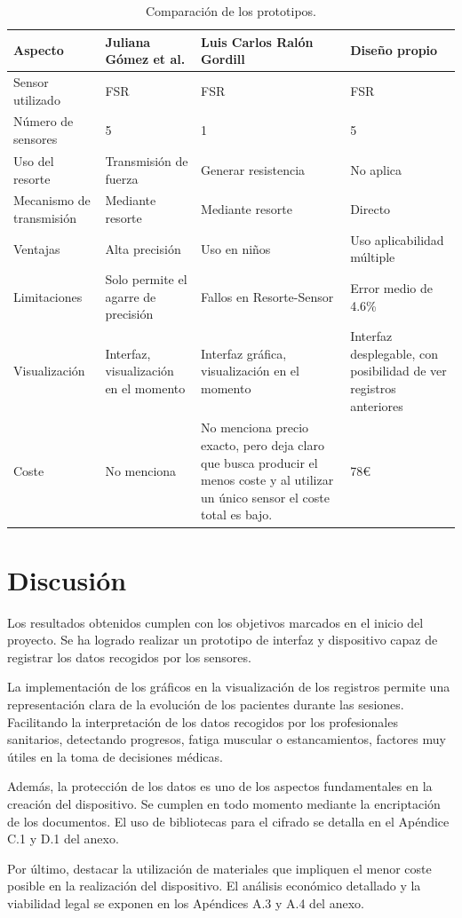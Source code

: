 \begin{table}[h]
    \centering
    \begin{tabular}{|p{2.5cm}|p{3.5cm}|p{4cm}|p{3.8cm}|}
    \rowcolor[HTML]{BFBFBF} 
    \hline
    \textbf{Aspecto} & \textbf{Juliana Gómez et al.} & \textbf{Luis Carlos Ralón Gordill} & \textbf{Diseño propio} \\ \hline
    Sensor utilizado   & FSR  & FSR  & FSR \\ \hline
    Número de sensores   & 5  & 1  & 5 \\ \hline
    Uso del resorte & Transmisión de fuerza & Generar resistencia  & No aplica   \\ \hline
    Mecanismo de transmisión   & Mediante resorte  & Mediante resorte & Directo  \\ \hline
    Ventajas   & Alta precisión  & Uso en niños  & Uso aplicabilidad múltiple \\ \hline
    Limitaciones & Solo permite el agarre de precisión & Fallos en Resorte-Sensor & Error medio de 4.6\% \\ \hline
    Visualización & Interfaz, visualización en el momento & Interfaz gráfica, visualización en el momento& Interfaz desplegable, con posibilidad de ver registros anteriores \\ \hline
    Coste    & No menciona    & No menciona precio exacto, pero deja claro que busca producir el menos coste y al utilizar un único sensor el coste total es bajo. & 78€ \\ \hline
    \end{tabular}
    \caption{Comparación de los prototipos.}
    \label{tab:comparacion_diseños}
\end{table}
    
\section{Discusión}

Los resultados obtenidos cumplen con los objetivos marcados en el inicio del proyecto. Se ha logrado realizar un prototipo de interfaz y dispositivo capaz de registrar los datos recogidos por los sensores.

La implementación de los gráficos en la visualización de los registros permite una representación clara de la evolución de los pacientes durante las sesiones. Facilitando la interpretación de los datos recogidos por los profesionales sanitarios, detectando progresos, fatiga muscular o estancamientos, factores muy útiles en la toma de decisiones médicas.

Además, la protección de los datos es uno de los aspectos fundamentales en la creación del dispositivo. Se cumplen en todo momento mediante la encriptación de los documentos. El uso de bibliotecas para el cifrado se detalla en el Apéndice C.1 y D.1 del anexo.

Por último, destacar la utilización de materiales que impliquen el menor coste posible en la realización del dispositivo. El análisis económico detallado y la viabilidad legal se exponen en los Apéndices A.3 y A.4 del anexo.
